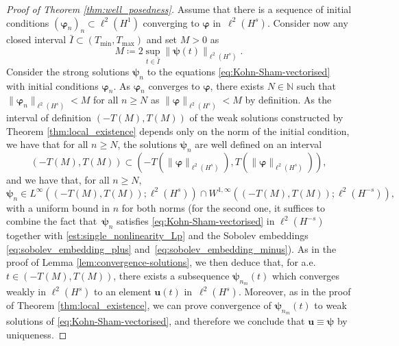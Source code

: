 \documentclass[12pt,a4paper]{amsart}
\numberwithin{equation}{section}
\newcommand{\ulu}{\boldsymbol{u}}
\newcommand{\ulpsi}{\boldsymbol{\psi}}
\newcommand{\ulphi}{\boldsymbol{\varphi}}
\begin{document}
\begin{proof}[Proof of Theorem \ref{thm:well_posedness}]
		
		Assume that there is a sequence of initial conditions $ (\ulphi_{n})_n \subset \ell^2(H^1) $ converging to $\ulphi$ in~$\ell^2(H^s)$. Consider now any closed interval $ \bar{I} \subset (T_{\mathrm{min}},T_{\mathrm{max}})$ and set $M>0$ as 
		\begin{equation}
			M \coloneq 2 \sup_{t \in \bar{I} } \| \ulpsi(t) \|_{\ell^2(H^s)} .
		\end{equation}
		Consider the strong solutions $\ulpsi_{n}$ to the equations \eqref{eq:Kohn-Sham-vectorised} with initial conditions $\ulphi_{n}$.  As $ \ulphi_{n} $ converges to $\ulphi$, there exists $N\in\mathbb{N}$ such that $ \| \ulphi_{n} \|_{\ell^2(H^s)} < M $ for all $n \geq N$ as $\| \ulphi \|_{\ell^2(H^s)} < M$ by definition. As the interval of definition $ \left( -T(M),T(M) \right) $ of the weak solutions constructed by Theorem \ref{thm:local_existence} depends only on the norm of the initial condition, we have that for all $n \geq N$, the solutions $\ulpsi_{n}$ are well defined on an interval 
		\begin{equation}
			(-T(M),T(M) ) \subset \left( -T(\|\ulphi\|_{\ell^2(H^s)}),T(\|\ulphi\|_{\ell^2(H^s)}) \right),
		\end{equation}
		and we have that, for all $n \geq N$,
		\begin{equation}
			\ulpsi_{n} \in L^\infty((-T(M),T(M) );\ell^2(H^s)) \cap W^{1,\infty} ((-T(M),T(M) );\ell^2(H^{-s})) , 
		\end{equation}
		with a uniform bound in $n$ for both norms (for the second one, it suffices to combine the fact that~$\ulpsi_{n}$ satisfies \eqref{eq:Kohn-Sham-vectorised} in $\ell^2(H^{-s})$ together with \eqref{est:single_nonlinearity_Lp} and the Sobolev embeddings \eqref{eq:sobolev_embedding_plus} and~\eqref{eq:sobolev_embedding_minus}). As in the proof of Lemma \ref{lem:convergence-solutions}, we then deduce that, for a.e. $t\in(-T(M),T(M))$, there exists a subsequence $\ulpsi_{n_m}(t)$ which converges weakly in $\ell^2(H^s)$ to an element $ \ulu(t)$ in~$\ell^2(H^s) $. Moreover, as in the proof of Theorem \ref{thm:local_existence}, we can prove convergence of $\ulpsi_{n_m}(t) $ to weak solutions of \eqref{eq:Kohn-Sham-vectorised}, and therefore we conclude that $\ulu \equiv \ulpsi$ by uniqueness.
		

\end{proof}
\end{document}
